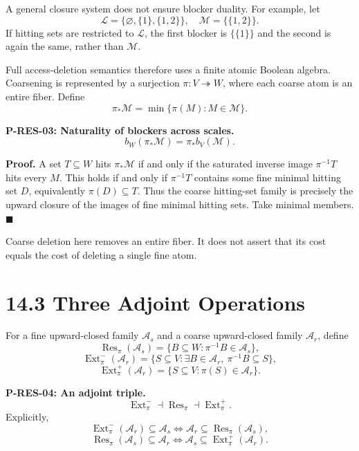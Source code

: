 \documentclass[
  english,
  11pt,
  oneside]{book}
\begin{document}
A general closure system does not ensure blocker duality. For example, let \[\mathcal L=\{\varnothing,\{1\},\{1,2\}\},\quad
\mathcal M=\{\{1,2\}\}.\] If hitting sets are restricted to \(\mathcal L\), the first blocker is \(\{\{1\}\}\) and the second is again the same, rather than \(\mathcal M\).

Full access-deletion semantics therefore uses a finite atomic Boolean algebra. Coarsening is represented by a surjection \(\pi:V\twoheadrightarrow W\), where each coarse atom is an entire fiber. Define \[\pi_*\mathcal M=\min\{\pi(M):M\in\mathcal M\}.\]

\hypertarget{p-res-03}{}\label{p-res-03}

\textbf{P-RES-03: Naturality of blockers across scales.} \[b_W(\pi_*\mathcal M)=\pi_*b_V(\mathcal M).\]

\textbf{Proof.} A set \(T\subseteq W\) hits \(\pi_*\mathcal M\) if and only if the saturated inverse image \(\pi^{-1}T\) hits every \(M\). This holds if and only if \(\pi^{-1}T\) contains some fine minimal hitting set \(D\), equivalently \(\pi(D)\subseteq T\). Thus the coarse hitting-set family is precisely the upward closure of the images of fine minimal hitting sets. Take minimal members. \(\blacksquare\)

Coarse deletion here removes an entire fiber. It does not assert that its cost equals the cost of deleting a single fine atom.

\section{14.3 Three Adjoint Operations}\label{three-adjoint-operations}

For a fine upward-closed family \(\mathcal A_s\) and a coarse upward-closed family \(\mathcal A_r\), define \[\operatorname{Res}_\pi(\mathcal A_s)
=\{B\subseteq W:\pi^{-1}B\in\mathcal A_s\},\] \[\operatorname{Ext}_\pi^-(\mathcal A_r)
=\{S\subseteq V:\exists B\in\mathcal A_r,\ \pi^{-1}B\subseteq S\},\] \[\operatorname{Ext}_\pi^+(\mathcal A_r)
=\{S\subseteq V:\pi(S)\in\mathcal A_r\}.\]

\hypertarget{p-res-04}{}\label{p-res-04}

\textbf{P-RES-04: An adjoint triple.} \[\operatorname{Ext}^-_\pi\dashv\operatorname{Res}_\pi
\dashv\operatorname{Ext}^+_\pi.\] Explicitly, \[\operatorname{Ext}^-_\pi(\mathcal A_r)\subseteq\mathcal A_s
\iff\mathcal A_r\subseteq\operatorname{Res}_\pi(\mathcal A_s),\] \[\operatorname{Res}_\pi(\mathcal A_s)\subseteq\mathcal A_r
\iff\mathcal A_s\subseteq\operatorname{Ext}^+_\pi(\mathcal A_r).\]
\end{document}
